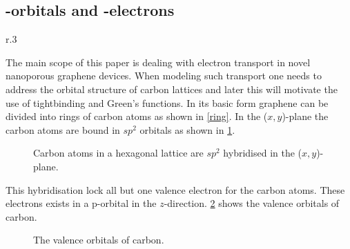 \subsection{\mathinhead{\pi}{\pi}-orbitals and \mathinhead{\pi}{\pi}-electrons}
\begin{wrapfigure}[7]{r}{.3\textwidth}
	\vspace{-2.3em}
	\centering
	\caption{Graphene lattices consists of hexagonal arrangements of carbon atoms.}\label{ring}
\end{wrapfigure}
The main scope of this paper is dealing with electron transport in novel nanoporous graphene devices.
When modeling such transport one needs to address the orbital structure of carbon lattices and later this will motivate the use of tightbinding and Green's functions.
In its basic form graphene can be divided into rings of carbon atoms as shown in \cref{ring}. In the (\(x,y\))-plane the carbon atoms are bound in \(sp^2\) orbitals as shown in \cref{sp2}.
\begin{figure}[H]
	\centering
	\caption{Carbon atoms in a hexagonal lattice are \(sp^2\) hybridised in the (\(x,y\))-plane.}\label{sp2}
\end{figure}
This hybridisation lock all but one valence electron for the carbon atoms. These electrons exists in a p-orbital in the \(z\)-direction.
\cref{p} shows the valence orbitals of carbon.
\begin{figure}[H]
	\begin{center}
		\caption{The valence orbitals of carbon.}
		\label{p}
	\end{center}
\end{figure}
